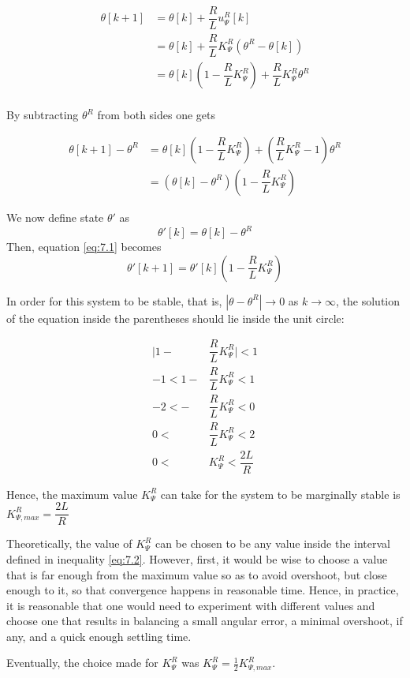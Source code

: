 \begin{align*}
  \theta[k+1] &= \theta[k] + \dfrac{R}{L} u_{\Psi}^R[k]  \\
            ~ &= \theta[k] + \dfrac{R}{L} K_{\Psi}^R (\theta^R - \theta[k]) \\
            ~ &= \theta[k](1 - \dfrac{R}{L} K_{\Psi}^R) + \dfrac{R}{L} K_{\Psi}^R \theta^R  \\
\end{align*}

By subtracting $\theta^R$ from both sides one gets

\begin{align}
  \theta[k+1] - \theta^R &= \theta[k](1 - \dfrac{R}{L} K_{\Psi}^R) + (\dfrac{R}{L} K_{\Psi}^R - 1) \theta^R \nonumber \\
                     ~ &= (\theta[k] - \theta^R)(1 - \dfrac{R}{L} K_{\Psi}^R) \label{eq:7.1}
\end{align}

We now define state $\theta'$ as
$$\theta'[k] = \theta[k] - \theta^R$$
Then, equation \ref{eq:7.1} becomes
$$\theta'[k+1] = \theta'[k](1 - \dfrac{R}{L} K_{\Psi}^R)$$

In order for this system to be stable, that is, $| \theta - \theta^R | \rightarrow 0$
as $k \rightarrow \infty$, the solution of the equation inside the parentheses
should lie inside the unit circle:

\begin{align}
  \Big|1 - &\dfrac{R}{L} K_{\Psi}^R\Big| < 1 \nonumber \\
  -1 < 1 - &\dfrac{R}{L} K_{\Psi}^R < 1 \nonumber \\
  -2 < - &\dfrac{R}{L} K_{\Psi}^R < 0 \nonumber \\
   0 <\ &\dfrac{R}{L} K_{\Psi}^R < 2 \nonumber \\
   0 <\ &K_{\Psi}^R < \dfrac{2L}{R} \label{eq:7.2}
\end{align}

Hence, the maximum value $K_{\Psi}^R$ can take for the system to be marginally
stable is $K_{\Psi,max}^R = \dfrac{2L}{R}$

Theoretically, the value of $K_{\Psi}^R$ can be chosen to be any value inside
the interval defined in inequality \ref{eq:7.2}. However, first, it would be
wise to choose a value that is far enough from the maximum value so as to avoid
overshoot, but close enough to it, so that convergence happens in reasonable
time. Hence, in practice, it is reasonable that one would need to experiment
with different values and choose one that results in balancing a small angular
error, a minimal overshoot, if any, and a quick enough settling time.

Eventually, the choice made for $K_{\Psi}^R$ was
$K_{\Psi}^R = \frac{1}{2} K_{\Psi,max}^R$.
